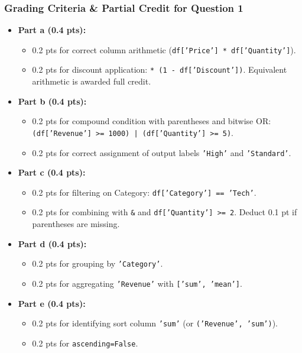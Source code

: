 \documentclass[11pt,a4paper]{article}
\begin{document}
\subsubsection*{Grading Criteria \& Partial Credit for Question 1}
\begin{itemize}[leftmargin=*, itemsep=3.5pt]
  \item \textbf{Part a (0.4 pts):}
  \begin{itemize}
    \item 0.2 pts for correct column arithmetic (\texttt{df['Price'] * df['Quantity']}).
    \item 0.2 pts for discount application: \texttt{* (1 - df['Discount'])}. Equivalent arithmetic is awarded full credit.
  \end{itemize}
  \item \textbf{Part b (0.4 pts):}
  \begin{itemize}
    \item 0.2 pts for compound condition with parentheses and bitwise OR: \texttt{(df['Revenue'] >= 1000) | (df['Quantity'] >= 5)}.
    \item 0.2 pts for correct assignment of output labels \texttt{'High'} and \texttt{'Standard'}.
  \end{itemize}
  \item \textbf{Part c (0.4 pts):}
  \begin{itemize}
    \item 0.2 pts for filtering on Category: \texttt{df['Category'] == 'Tech'}.
    \item 0.2 pts for combining with \texttt{\&} and \texttt{df['Quantity'] >= 2}. Deduct 0.1 pt if parentheses are missing.
  \end{itemize}
  \item \textbf{Part d (0.4 pts):}
  \begin{itemize}
    \item 0.2 pts for grouping by \texttt{'Category'}.
    \item 0.2 pts for aggregating \texttt{'Revenue'} with \texttt{['sum', 'mean']}.
  \end{itemize}
  \item \textbf{Part e (0.4 pts):}
  \begin{itemize}
    \item 0.2 pts for identifying sort column \texttt{'sum'} (or \texttt{('Revenue', 'sum')}).
    \item 0.2 pts for \texttt{ascending=False}.
  \end{itemize}
\end{itemize}
\end{document}
